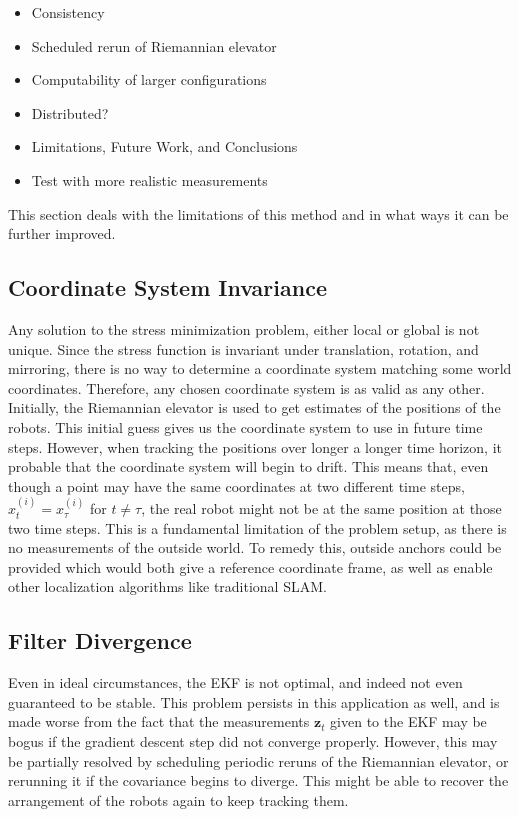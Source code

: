 \begin{itemize}
    \item Consistency
    \item Scheduled rerun of Riemannian elevator
    \item Computability of larger configurations
    \item Distributed? 
    \item Limitations, Future Work, and Conclusions
    \item Test with more realistic measurements
\end{itemize}

This section deals with the limitations of this method and in what ways it can be further improved.
\subsection{Coordinate System Invariance}
Any solution to the stress minimization problem, either local or global is not unique. Since the stress function is invariant under translation, rotation, and mirroring, there is no way to determine a coordinate system matching some world coordinates. Therefore, any chosen coordinate system is as valid as any other. Initially, the Riemannian elevator is used to get estimates of the positions of the robots. This initial guess gives us the coordinate system to use in future time steps. However, when tracking the positions over longer a longer time horizon, it probable that the coordinate system will begin to drift. This means that, even though a point may have the same coordinates at two different time steps, $x^{(i)}_t = x^{(i)}_\tau$ for $t \neq \tau$, the real robot might not be at the same position at those two time steps. This is a fundamental limitation of the problem setup, as there is no measurements of the outside world. To remedy this, outside anchors could be provided which would both give a reference coordinate frame, as well as enable other localization algorithms like traditional SLAM. 

\subsection{Filter Divergence}
Even in ideal circumstances, the EKF is not optimal, and indeed not even guaranteed to be stable. This problem persists in this application as well, and is made worse from the fact that the measurements $\mathbf{z}_t$ given to the EKF may be bogus if the gradient descent step did not converge properly. However, this may be partially resolved by scheduling periodic reruns of the Riemannian elevator, or rerunning it if the covariance begins to diverge. This might be able to recover the arrangement of the robots again to keep tracking them.

